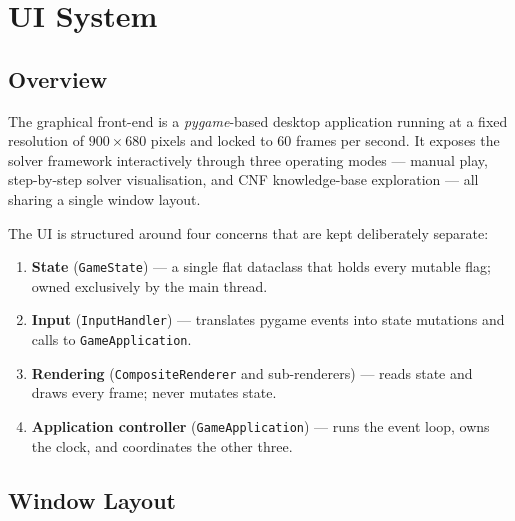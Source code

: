 \section{UI System}
\label{sec:ui_system}

\subsection{Overview}

The graphical front-end is a \emph{pygame}-based desktop application running
at a fixed resolution of $900 \times 680$ pixels and locked to 60 frames per
second.
It exposes the solver framework interactively through three operating modes —
manual play, step-by-step solver visualisation, and CNF knowledge-base
exploration — all sharing a single window layout.

The UI is structured around four concerns that are kept deliberately separate:

\begin{enumerate}
  \item \textbf{State} (\texttt{GameState}) — a single flat dataclass that
        holds every mutable flag; owned exclusively by the main thread.
  \item \textbf{Input} (\texttt{InputHandler}) — translates pygame events into
        state mutations and calls to \texttt{GameApplication}.
  \item \textbf{Rendering} (\texttt{CompositeRenderer} and sub-renderers) —
        reads state and draws every frame; never mutates state.
  \item \textbf{Application controller} (\texttt{GameApplication}) — runs the
        event loop, owns the clock, and coordinates the other three.
\end{enumerate}

\subsection{Window Layout}
\label{sec:ui_layout}

